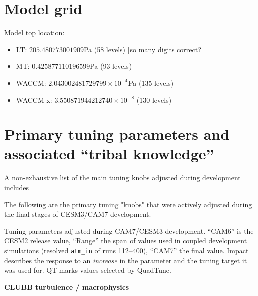 \documentclass[draft]{agujournal2019}
\begin{document}
\section{Model grid}
Model top location:
\begin{itemize}
\item LT: $205.480773001909$Pa (58 levels)
[so many digits correct?]
\item MT: $0.425877110196599$Pa (93 levels)
\item WACCM: $2.043002481729799\times 10^{-4}$Pa (135 levels)
\item WACCM-x: $3.550871944212740\times 10^{-8}$ (130 levels)
\end{itemize}
\section{Primary tuning parameters and associated “tribal knowledge”}

A non-exhaustive list of the main tuning knobs adjusted during development includes

The following are the primary tuning "knobs" that were actively adjusted during the final stages of CESM3/CAM7 development.


Tuning parameters adjusted during CAM7/CESM3 development. ``CAM6'' is the
CESM2 release value, ``Range'' the span of values used in coupled development
simulations (resolved \texttt{atm\_in} of runs 112--400), ``CAM7'' the final
value. Impact describes the response to an \emph{increase} in the parameter
and the tuning target it was used for. QT marks values selected by QuadTune.



\noindent\textbf{CLUBB turbulence / macrophysics}
\medskip
\end{document}
